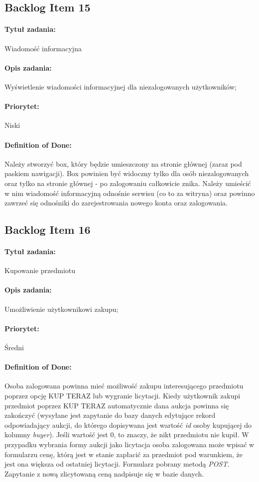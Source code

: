 \documentclass[a4paper]{article}
\begin{document}
	\subsection{Backlog Item 15}
	\paragraph{Tytuł zadania:} Wiadomość informacyjna
	\paragraph{Opis zadania:} Wyświetlenie wiadomości informacyjnej dla niezalogowanych użytkowników;
	\paragraph{Priorytet:} Niski
	\paragraph{Definition of Done:} Należy stworzyć box, który będzie umieszczony na stronie głównej (zaraz pod paskiem nawigacji). Box powinien być widoczny tylko dla osób niezalogowanych oraz tylko na stronie głównej - po zalogowaniu całkowicie znika. Należy umieścić w nim wiadomość informacyjną odnośnie serwisu (co to za witryna) oraz powinno zawrzeć się odnośniki do zarejestrowania nowego konta oraz zalogowania.
	
	\subsection{Backlog Item 16}
	\paragraph{Tytuł zadania:} Kupowanie przedmiotu
	\paragraph{Opis zadania:} Umożliwienie użytkownikowi zakupu;
	\paragraph{Priorytet:} Średni
	\paragraph{Definition of Done:} Osoba zalogowana powinna mieć możliwość zakupu interesującego przedmiotu poprzez opcję KUP TERAZ lub wygranie licytacji. Kiedy użytkownik zakupi przedmiot poprzez KUP TERAZ automatycznie dana aukcja powinna się zakończyć (wysyłane jest zapytanie do bazy danych edytujące rekord odpowiadający aukcji, do którego dopisywana jest wartość \emph{id} osoby kupującej do kolumny \emph{buyer}). Jeśli wartość jest 0, to znaczy, że nikt przedmiotu nie kupił. W przypadku wybrania formy aukcji jako licytacja osoba zalogowana może wpisać w formularzu cenę, którą jest w stanie zapłacić za przedmiot pod warunkiem, że jest ona większa od ostatniej licytacji. Formularz pobrany metodą \emph{POST}. Zapytanie z nową zlicytowaną ceną nadpisuje się w bazie danych.
	
\end{document}
